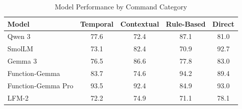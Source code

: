 \begin{table}[htbp]
\centering
\caption{Model Performance by Command Category}
\label{tab:category_breakdown}
\begin{tabular}{lcccc}
\toprule
\textbf{Model} & \textbf{Temporal} & \textbf{Contextual} & \textbf{Rule-Based} & \textbf{Direct} \\
\midrule
Qwen 3 & 77.6 & 72.4 & 87.1 & 81.0 \\
SmolLM & 73.1 & 82.4 & 70.9 & 92.7 \\
Gemma 3 & 76.5 & 86.6 & 77.8 & 83.0 \\
Function-Gemma & 83.7 & 74.6 & 94.2 & 89.4 \\
Function-Gemma Pro & 93.5 & 92.4 & 84.9 & 93.0 \\
LFM-2 & 72.2 & 74.9 & 71.1 & 78.1 \\
\bottomrule
\end{tabular}
\end{table}